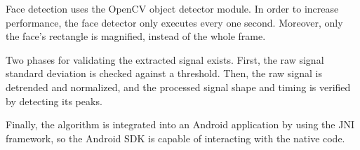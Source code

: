 Face detection uses the OpenCV object detector module. In order to increase
performance, the face detector only executes every one second. Moreover,
only the face's rectangle is magnified, instead of the whole frame.

Two phases for validating the extracted signal exists. First, the raw
signal standard deviation is checked against a threshold. Then, the raw signal
is detrended and normalized, and the processed signal shape and timing is
verified by detecting its peaks.

Finally, the algorithm is integrated into an Android application by using
the JNI framework, so the Android SDK is capable of interacting with
the native code.
